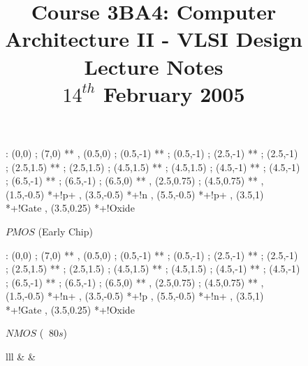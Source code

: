 \documentclass[a4paper,12pt]{article}
\begin{document}
\title{Course 3BA4: Computer Architecture II - VLSI Design \\ Lecture Notes \\ $14^{th}$ February 2005}

\maketitle

\begin{figure}[ht]



\end{figure}

\begin{figure}[ht]

\xy<1cm,0cm>:
(0,0)     ; (7,0) **\dir{-} ,
(0.5,0)   ; (0.5,-1) **\dir{-} ;
(0.5,-1)  ; (2.5,-1) **\dir{-} ;
(2.5,-1)  ; (2.5,1.5) **\dir{-} ;
(2.5,1.5) ; (4.5,1.5) **\dir{-} ;
(4.5,1.5) ; (4.5,-1) **\dir{-} ;
(4.5,-1)  ; (6.5,-1) **\dir{-} ;
(6.5,-1)  ; (6.5,0) **\dir{-} ,
%
(2.5,0.75) ; (4.5,0.75) **\dir{-} ,
%
\POS (1.5,-0.5) *+!{p+} ,
\POS (3.5,-0.5) *+!{n} ,
\POS (5.5,-0.5) *+!{p+} ,
\POS (3.5,1)    *+!{Gate} ,
\POS (3.5,0.25) *+!{Oxide}
\endxy

\caption{$PMOS$ (Early Chip)}

\end{figure}


\begin{figure}[ht]

\xy<1cm,0cm>:
(0,0)     ; (7,0) **\dir{-} ,
(0.5,0)   ; (0.5,-1) **\dir{-} ;
(0.5,-1)  ; (2.5,-1) **\dir{-} ;
(2.5,-1)  ; (2.5,1.5) **\dir{-} ;
(2.5,1.5) ; (4.5,1.5) **\dir{-} ;
(4.5,1.5) ; (4.5,-1) **\dir{-} ;
(4.5,-1)  ; (6.5,-1) **\dir{-} ;
(6.5,-1)  ; (6.5,0) **\dir{-} ,
%
(2.5,0.75) ; (4.5,0.75) **\dir{-} ,
%
\POS (1.5,-0.5) *+!{n+} ,
\POS (3.5,-0.5) *+!{p} ,
\POS (5.5,-0.5) *+!{n+} ,
\POS (3.5,1)    *+!{Gate} ,
\POS (3.5,0.25) *+!{Oxide}
\endxy

\caption{$NMOS$ ($~$ $80s$)}

\end{figure}

\begin{figure}[ht]

\begin{tabular}{lll}
	&	&		\\
 \\
\end{tabular}

\end{figure}
\end{document}
